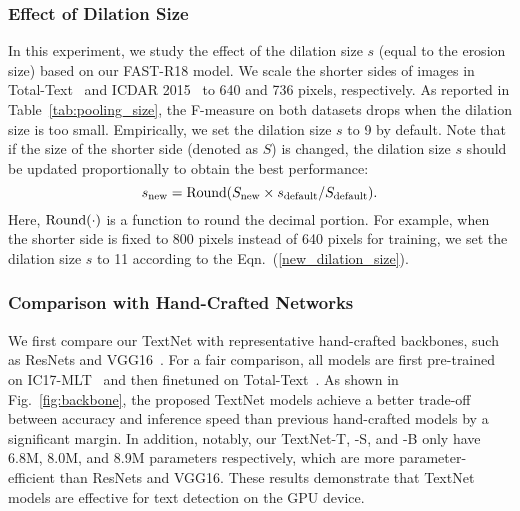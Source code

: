 \documentclass[lettersize,journal]{IEEEtran}
\begin{document}
\subsubsection{Effect of Dilation Size}
In this experiment, we study the effect of the dilation size $s$ (equal to the erosion size) based on our FAST-R18 model.
We scale the shorter sides of images in Total-Text~\cite{ch2017total} and ICDAR 2015~\cite{karatzas2015icdar} to 640 and 736 pixels, respectively.
As reported in Table~\ref{tab:pooling_size}, the F-measure on both datasets drops when the dilation size is too small.
Empirically, we set the dilation size $s$ to 9 by default. 
Note that if the size of the shorter side (denoted as $S$) is changed, the dilation size $s$ should be updated proportionally to obtain the best performance:
\begin{equation}
	s_{\rm new}={\rm Round} (S_{\rm new} \times s_{\rm default} / S_{\rm default}).
	\label{new_dilation_size}
\end{equation}
Here, ${\rm Round(\cdot)}$ is a function to round the decimal portion.
For example, when the shorter side is fixed to 800 pixels instead of 640 pixels for training, we set the dilation size $s$ to 11 according to the Eqn.~(\ref{new_dilation_size}). 





\subsubsection{Comparison with Hand-Crafted Networks}
We first compare our TextNet with representative hand-crafted backbones, such as ResNets \cite{he2016deep} and VGG16~\cite{simonyan2014very}.
For a fair comparison, all models are first pre-trained on IC17-MLT~\cite{nayef2017icdar2017} and then finetuned on Total-Text~\cite{ch2017total}.
As shown in Fig.~\ref{fig:backbone}, the proposed TextNet models achieve a better trade-off between accuracy and inference speed than previous hand-crafted models by a significant margin.
In addition, notably, our TextNet-T, -S, and -B only have 6.8M, 8.0M, and 8.9M parameters respectively, which are more parameter-efficient than ResNets and VGG16. 
These results demonstrate that TextNet models are effective for text detection on the GPU device. 
\end{document}
